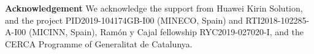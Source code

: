 \documentclass[10pt,twocolumn,letterpaper]{article}
\begin{document}
\small{\textbf{Acknowledgement} We acknowledge the support from Huawei Kirin Solution, and the project PID2019-104174GB-I00 (MINECO, Spain) and RTI2018-102285-A-I00 (MICINN, Spain), Ramón y Cajal fellowship RYC2019-027020-I, and the CERCA Programme of Generalitat de Catalunya.}


{\small


}
\end{document}
